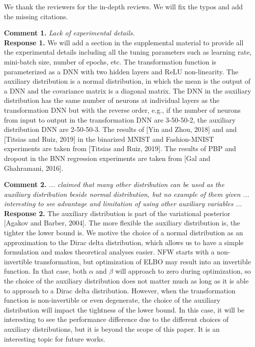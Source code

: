 \documentclass{article}
\begin{document}
\phantom{abc}
\vspace{-1.6cm}
We thank the reviewers for the in-depth reviews. We will fix the typos and add the missing citations.

\textbf{Comment 1.} \textit{Lack of experimental details.}\\
\textbf{Response 1.} We will add a section in the supplemental material to provide all the experimental details including all the tuning parameters such as learning rate, mini-batch size, number of epochs, etc. The transformation function is parameterized as a DNN with two hidden layers and ReLU non-linearity. The auxiliary distribution is a normal distribution, in which the mean is the output of a DNN and the covariance matrix is a diagonal matrix. The DNN in the auxiliary distribution has the same number of neurons at individual layers as the transformation DNN but with the reverse order, e.g., if the number of neurons from input to output in the transformation DNN are 3-50-50-2, the auxiliary distribution DNN are 2-50-50-3. The results of [Yin and Zhou, 2018] and and [Titsias and Ruiz, 2019] in the binarized MNIST and Fashion-MNIST experiments are taken from [Titsias and Ruiz, 2019]. The results of PBP and dropout in the BNN regression experiments are taken from [Gal and Ghahramani, 2016]. 

\textbf{Comment 2.} \textit{...  claimed that many other distribution can be used as the auxiliary distribution beside normal distribution, but no example of them given ... interesting to see advantage and limitation of using other auxiliary variables ...}\\
 \textbf{Response 2.} The auxiliary distribution is part of the variational posterior [Agakov and Barber, 2004]. The more flexible the auxiliary distribution is, the tighter the lower bound is. We motive the choice of a normal distribution as an approximation to the Dirac delta distribution, which allows us to have a simple formulation and makes theoretical analyses easier. NFW starts with a non-invertible transformation, but optimization of ELBO may result into an invertible function. In that case, both $\alpha$ and $\beta$ will approach to zero during optimization, so the choice of the auxiliary distribution does not matter much as long as it is able to approach to a Dirac delta distribution. However, when the transformation function is non-invertible or even degenerate, the choice of the auxiliary distribution will impact the tightness of the lower bound. In this case, it will be interesting to see the performance difference due to the different choices of auxiliary distributions, but it is beyond the scope of this paper. It is an interesting topic for future works.
\end{document}
